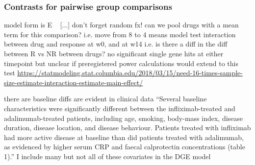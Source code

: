 \begin{outline}
\subsubsection{Contrasts for pairwise group comparisons}

\1 model form is E ~ [...] don't forget random fx!
\1 can we pool drugs with a mean term for this comparison? i.e. move from 8 to 4 means model
    \2 test interaction between drug and response at w0, and at w14 i.e. is there a diff in the diff between R vs NR between drugs?
    \2 no significant single gene hits at either timepoint
    \2 but unclear if preregistered power calculations would extend to this test \url{https://statmodeling.stat.columbia.edu/2018/03/15/need-16-times-sample-size-estimate-interaction-estimate-main-effect/}

    \2 there are baseline diffs are evident in clinical data 
    \2 “Several baseline characteristics were significantly different between the infliximab-treated and adalimumab-treated patients, including age, smoking, body-mass index, disease duration, disease location, and disease behaviour. Patients treated with infliximab had more active disease at baseline than did patients treated with adalimumab, as evidenced by higher serum CRP and faecal calprotectin concentrations (table 1).” \autocite{kennedy2019PredictorsAntiTNFTreatment}
    \2 I include many but not all of these covariates in the DGE model


\end{outline}
